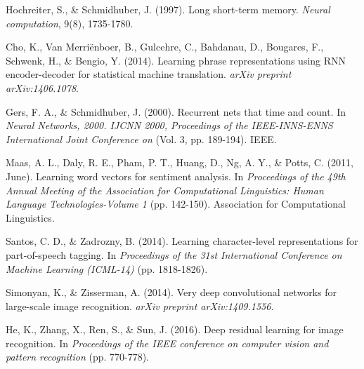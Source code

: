 \documentclass[10pt,twocolumn,letterpaper]{article}
\begin{document}
\begin{thebibliography}{9}
Hochreiter, S., \& Schmidhuber, J. (1997). Long short-term memory. \textit{Neural computation}, 9(8), 1735-1780.

Cho, K., Van Merriënboer, B., Gulcehre, C., Bahdanau, D., Bougares, F., Schwenk, H., \& Bengio, Y. (2014). Learning phrase representations using RNN encoder-decoder for statistical machine translation. \textit{arXiv preprint arXiv:1406.1078}.

Gers, F. A., \& Schmidhuber, J. (2000). Recurrent nets that time and count. In \textit{Neural Networks, 2000. IJCNN 2000, Proceedings of the IEEE-INNS-ENNS International Joint Conference on} (Vol. 3, pp. 189-194). IEEE.

Maas, A. L., Daly, R. E., Pham, P. T., Huang, D., Ng, A. Y., \& Potts, C. (2011, June). Learning word vectors for sentiment analysis. In \textit{Proceedings of the 49th Annual Meeting of the Association for Computational Linguistics: Human Language Technologies-Volume 1} (pp. 142-150). Association for Computational Linguistics.

Santos, C. D., \& Zadrozny, B. (2014). Learning character-level representations for part-of-speech tagging. In \textit{Proceedings of the 31st International Conference on Machine Learning (ICML-14)} (pp. 1818-1826).

Simonyan, K., \& Zisserman, A. (2014). Very deep convolutional networks for large-scale image recognition. \textit{arXiv preprint arXiv:1409.1556}.

He, K., Zhang, X., Ren, S., \& Sun, J. (2016). Deep residual learning for image recognition. In \textit{Proceedings of the IEEE conference on computer vision and pattern recognition} (pp. 770-778).
\end{thebibliography}
\end{document}
